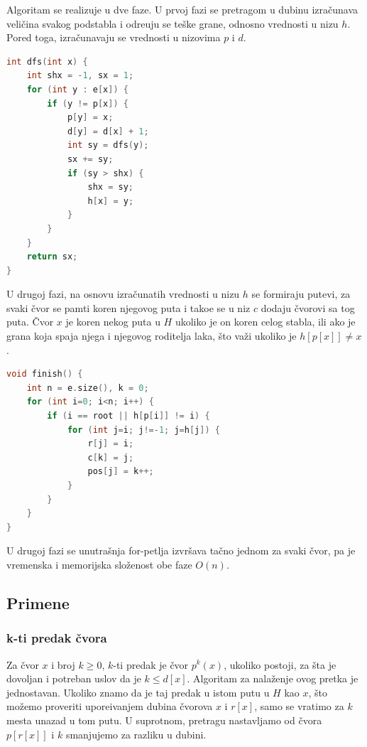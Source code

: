 Algoritam se realizuje u dve faze. U prvoj fazi se pretragom u dubinu izra\v cunava veli\v cina svakog podstabla i odre\dj uju se te\v ske grane, odnosno vrednosti u nizu $h$. Pored toga, izra\v cunavaju se vrednosti u nizovima $p$ i $d$.

\noindent
\begin{minipage}{\textwidth}
\begin{lstlisting}[language=C++, title={Implementacija prve faze algoritma:}, style=customcpp]
int dfs(int x) {
	int shx = -1, sx = 1;
	for (int y : e[x]) {
		if (y != p[x]) {
			p[y] = x;
			d[y] = d[x] + 1;
			int sy = dfs(y);
			sx += sy;
			if (sy > shx) {
				shx = sy;
				h[x] = y;
			}
		}
	}
	return sx;
}
\end{lstlisting}
\end{minipage}

U drugoj fazi, na osnovu izra\v cunatih vrednosti u nizu $h$ se formiraju putevi, za svaki \v cvor se pamti koren njegovog puta i tako\dj e se u niz $c$ dodaju \v cvorovi sa tog puta. \v Cvor $x$ je koren nekog puta u $H$ ukoliko je on koren celog stabla, ili ako je grana koja spaja njega i njegovog roditelja laka, \v sto va\v zi ukoliko je $h[p[x]] \not = x$.

\noindent
\begin{minipage}{\textwidth}
\begin{lstlisting}[language=C++, title={Implementacija druge faze algoritma:}, style=customcpp]
void finish() {
	int n = e.size(), k = 0;
	for (int i=0; i<n; i++) {
		if (i == root || h[p[i]] != i) {
			for (int j=i; j!=-1; j=h[j]) {
				r[j] = i;
				c[k] = j;
				pos[j] = k++;
			}
		}
	}
}
\end{lstlisting}
\end{minipage}

U drugoj fazi se unutra\v snja for-petlja izvr\v sava ta\v cno jednom za svaki \v cvor, pa je vremenska i memorijska slo\v zenost obe faze $O(n)$. 

\subsection{Primene}

\subsubsection{k-ti predak \v cvora}

Za \v cvor $x$ i broj $k \geq 0$, $k$-ti predak je \v cvor $p^k(x)$, ukoliko postoji, za \v sta je dovoljan i potreban uslov da je $k \leq d[x]$. Algoritam za nala\v zenje ovog pretka je jednostavan. Ukoliko znamo da je taj predak u istom putu u $H$ kao $x$, \v sto mo\v zemo proveriti upore\dj ivanjem dubina \v cvorova $x$ i $r[x]$, samo se vratimo za $k$ mesta unazad u tom putu. U suprotnom, pretragu nastavljamo od \v cvora $p[r[x]]$ i $k$ smanjujemo za razliku u dubini.

